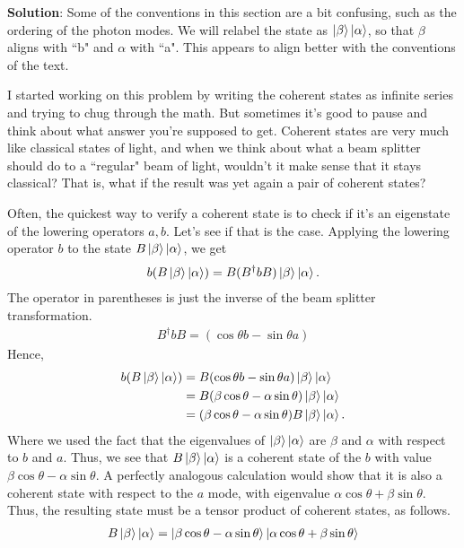 \documentclass{book}
\begin{document}
    \textbf{Solution}: Some of the conventions in this section are a bit confusing, such as the ordering of the photon modes. We will relabel the state as $\ket{\beta}\ket{\alpha}$, so that $\beta$ aligns with ``b" and $\alpha$ with ``a". This appears to align better with the conventions of the text. 

    I started working on this problem by writing the coherent states as infinite series and trying to chug through the math. But sometimes it's good to pause and think about what answer you're supposed to get. Coherent states are very much like classical states of light, and when we think about what a beam splitter should do to a ``regular" beam of light, wouldn't it make sense that it stays classical? That is, what if the result was yet again a pair of coherent states?

    Often, the quickest way to verify a coherent state is to check if it's an eigenstate of the lowering operators $a,b$. Let's see if that is the case. Applying the lowering operator $b$ to the state $B\ket{\beta}\ket{\alpha}$, we get
    \begin{align}
        b (B \ket{\beta}\ket{\alpha}) = B (B^\dagger b B) \ket{\beta}\ket{\alpha}.
    \end{align}
    The operator in parentheses is just the inverse of the beam splitter transformation.
    \begin{align}
        B^\dagger b B = (\cos\theta b - \sin\theta a)
    \end{align}
    Hence, 
    \begin{align}
    \begin{aligned}
        b (B \ket{\beta}\ket{\alpha}) &= B (\cos\theta b - \sin\theta a) \ket{\beta}\ket{\alpha} \\
        &= B(\beta \cos\theta - \alpha \sin\theta) \ket{\beta}\ket{\alpha} \\
        &= (\beta \cos\theta - \alpha \sin\theta) B \ket{\beta}\ket{\alpha}.
    \end{aligned}
    \end{align}
    Where we used the fact that the eigenvalues of $\ket{\beta}\ket{\alpha}$ are $\beta$ and $\alpha$ with respect to $b$ and $a$. Thus, we see that $B \ket{\beta}\ket{\alpha}$ is a coherent state of the $b$ with value $\beta \cos\theta - \alpha \sin\theta$. A perfectly analogous calculation would show that it is also a coherent state with respect to the $a$ mode, with eigenvalue $\alpha \cos\theta + \beta \sin\theta$. Thus, the resulting state must be a tensor product of coherent states, as follows.
    \begin{align}
        B \ket{\beta} \ket{\alpha} = \ket{\beta \cos\theta - \alpha \sin\theta} \ket{\alpha \cos\theta + \beta \sin\theta}
    \end{align}
\end{document}
